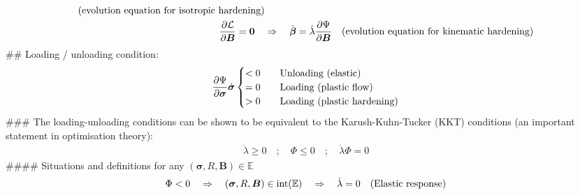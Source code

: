 \documentclass[]{scrartcl}
\begin{document}
\begin{easylist}[itemize]
\begin{align*}
\quad \textnormal{(evolution equation for isotropic hardening)}
\\
\frac{\partial \mathcal{L}}{\partial \boldsymbol{B}} = \boldsymbol{0}
\quad &\Rightarrow \quad
\dot{\boldsymbol{\beta}} = \dot{\lambda} \frac{\partial \Psi}{\partial \boldsymbol{B}}
\quad \textnormal{(evolution equation for kinematic hardening)}
\\
\end{align*}
## Loading / unloading condition:
\begin{align*}
\frac{\partial \Psi}{\partial \boldsymbol{\sigma}} \dot{\boldsymbol{\sigma}}
\begin{cases}
< 0 \quad & \textnormal{Unloading (elastic)} \\
= 0 \quad & \textnormal{Loading (plastic flow)} \\
> 0 \quad & \textnormal{Loading (plastic hardening)}
\end{cases}
\end{align*}
### The loading-unloading conditions can be shown to be equivalent to the Karush-Kuhn-Tucker (KKT) conditions (an important statement in optimisation theory):
\begin{gather}
\dot{\lambda} \geq 0
\quad;\quad
\Phi \leq 0
\quad;\quad
\dot{\lambda} \Phi = 0
\end{gather}
#### Situations and definitions for any $\left( \boldsymbol{\sigma},R,\boldsymbol{B} \right) \in \mathbb{E}$
\begin{align*}
\Phi < 0 
  \quad &\Rightarrow \quad 
  \left( \boldsymbol{\sigma},R,\boldsymbol{B} \right) \in \textnormal{int}(\mathbb{E})
  \quad \Rightarrow \quad 
  \dot{\lambda} = 0 \quad \textnormal{(Elastic response)} \\

\end{align*}
\end{easylist}
\end{document}
